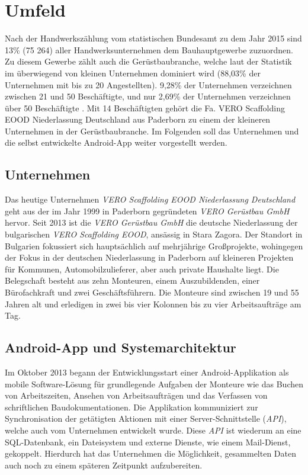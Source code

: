 \section{Umfeld}
Nach der Handwerkszählung vom statistischen Bundesamt zu dem Jahr 2015 sind 13\% (75 264) aller Handwerksunternehmen dem Bauhauptgewerbe zuzuordnen.
Zu diesem Gewerbe zählt auch die Gerüstbaubranche, welche laut der Statistik im überwiegend von kleinen Unternehmen dominiert wird (88,03\% der Unternehmen mit bis zu 20 Angestellten). 
9,28\% der Unternehmen verzeichnen zwischen 21 und 50 Beschäftigte, und nur 2,69\% der Unternehmen verzeichnen über 50 Beschäftigte \citep{HZ16}.
Mit 14 Beschäftigten gehört die Fa. VERO Scaffolding EOOD Niederlassung Deutschland aus Paderborn zu einem der kleineren Unternehmen in der Gerüstbaubranche.
Im Folgenden soll das Unternehmen und die selbst entwickelte Android-App weiter vorgestellt werden.

\subsection{Unternehmen}
Das heutige Unternehmen \emph{VERO Scaffolding EOOD Niederlassung Deutschland} geht aus der im Jahr 1999 in Paderborn gegründeten \emph{VERO Gerüstbau GmbH} hervor. 
Seit 2013 ist die \emph{VERO Gerüstbau GmbH} die deutsche Niederlassung der bulgarischen \emph{VERO Scaffolding EOOD}, ansässig in Stara Zagora.
Der Standort in Bulgarien fokussiert sich hauptsächlich auf mehrjährige Großprojekte, wohingegen der Fokus in der deutschen Niederlassung in Paderborn auf kleineren Projekten für Kommunen, Automobilzulieferer, aber auch private Haushalte liegt.
Die Belegschaft besteht aus zehn Monteuren, einem Auszubildenden, einer Bürofachkraft und zwei Geschäftsführern.
Die Monteure sind zwischen 19 und 55 Jahren alt und erledigen in zwei bis vier Kolonnen bis zu vier Arbeitsaufträge am Tag.

\subsection{Android-App und Systemarchitektur}
Im Oktober 2013 begann der Entwicklungsstart einer Android-Applikation als mobile Software-Lösung für grundlegende Aufgaben der Monteure wie das Buchen von Arbeitszeiten, Ansehen von Arbeitsaufträgen und das Verfassen von schriftlichen Baudokumentationen.
Die Applikation kommuniziert zur Synchronisation der getätigten Aktionen mit einer Server-Schnittstelle (\emph{API}), welche auch vom Unternehmen entwickelt wurde.
Diese \emph{API} ist wiederum an eine SQL-Datenbank, ein Dateisystem und externe Dienste, wie einem Mail-Dienst, gekoppelt.
Hierdurch hat das Unternehmen die Möglichkeit, gesammelten Daten auch noch zu einem späteren Zeitpunkt aufzubereiten.

